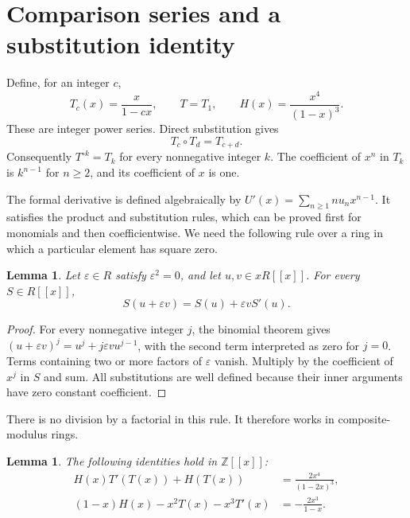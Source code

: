 \documentclass[11pt,a4paper]{article}
\newtheorem{lemma}[theorem]{Lemma}
\theoremstyle{remark}
\newcommand{\Z}{\mathbb Z}
\begin{document}
\section{Comparison series and a substitution identity}

Define, for an integer $c$,
\begin{equation}\label{eq:tH}
T_c(x)=\frac{x}{1-cx},\qquad T=T_1,\qquad
H(x)=\frac{x^4}{(1-x)^3}.
\end{equation}
These are integer power series. Direct substitution gives
\begin{equation}\label{eq:t-group}
T_c\circ T_d=T_{c+d}.
\end{equation}
Consequently $T^{\circ k}=T_k$ for every nonnegative integer $k$.
The coefficient of $x^n$ in $T_k$ is $k^{n-1}$ for $n\ge2$,
and its coefficient of $x$ is one.

The formal derivative is defined algebraically by
$U'(x)=\sum_{n\ge1}nu_nx^{n-1}$. It satisfies the product and
substitution rules, which can be proved first for monomials and then
coefficientwise. We need the following rule over a ring in which a
particular element has square zero.

\begin{lemma}\label{lem:taylor}
Let $\varepsilon\in R$ satisfy $\varepsilon^2=0$, and let
$u,v\in xR[[x]]$. For every $S\in R[[x]]$,
\[
S(u+\varepsilon v)=S(u)+\varepsilon vS'(u).
\]
\end{lemma}

\begin{proof}
For every nonnegative integer $j$, the binomial theorem gives
$(u+\varepsilon v)^j=u^j+j\varepsilon vu^{j-1}$, with the second
term interpreted as zero for $j=0$. Terms containing two or more
factors of $\varepsilon$ vanish. Multiply by the coefficient of
$x^j$ in $S$ and sum. All substitutions are well defined because
their inner arguments have zero constant coefficient.
\end{proof}

There is no division by a factorial in this rule. It therefore works
in composite-modulus rings.

\begin{lemma}\label{lem:identities}
The following identities hold in $\Z[[x]]$:
\begin{align}
H(x)T'(T(x))+H(T(x))&=\frac{2x^4}{(1-2x)^3},
\label{eq:identity1}\\
(1-x)H(x)-x^2T(x)-x^3T'(x)&=-\frac{2x^3}{1-x}.
\label{eq:identity2}
\end{align}
\end{lemma}
\end{document}
